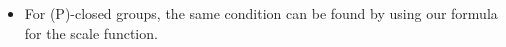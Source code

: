 \documentclass[preview]{standalone}
\begin{document}
\begin{center}
\begin{itemize} \item For (P)-closed groups, the same condition can be found by using our formula for the scale function.\vspace{-10pt}\end{itemize}
\end{center}
\end{document}
